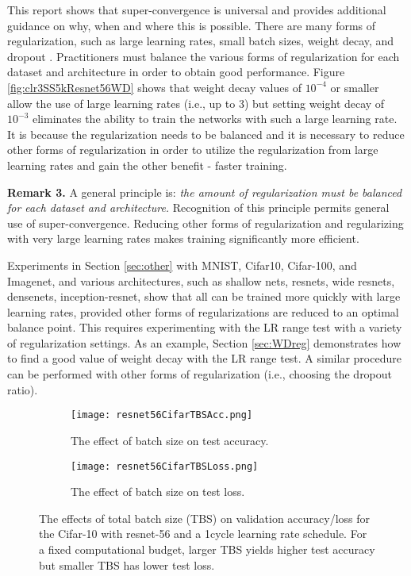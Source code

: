\documentclass{article} %
\begin{document}
This report shows that super-convergence is universal and provides additional guidance on why, when and where this is possible. There are many forms of regularization, such as large learning rates, small batch sizes, weight decay, and dropout \citep{srivastava2014dropout}.  Practitioners must balance the various forms of regularization for each dataset and architecture in order to obtain good performance.  Figure \ref{fig:clr3SS5kResnet56WD}  shows that weight decay values of $10^{-4}$ or smaller allow the use of large learning rates (i.e., up to 3) but setting weight decay of $10^{-3}$ eliminates the ability to train the networks with such a large learning rate.  It is because the regularization needs to be balanced and it is necessary to reduce other forms of regularization in order to utilize the regularization from large learning rates and gain the other benefit - faster training.

\textbf{Remark 3.}
A general principle is: \emph{the amount of regularization must be balanced for each dataset and architecture.}  Recognition of this principle permits general use of super-convergence.  Reducing other forms of regularization and regularizing with very large learning rates makes training significantly more efficient.  

Experiments in Section \ref*{sec:other} with MNIST, Cifar10, Cifar-100, and Imagenet, and various architectures, such as shallow nets,  resnets, wide resnets, densenets, inception-resnet, show that all can be trained more quickly with large learning rates, provided other forms of regularizations are reduced to an optimal balance point.  This requires experimenting with the LR range test with a variety of regularization settings.  As an example, Section \ref*{sec:WDreg} demonstrates how to find a good value of weight decay with the LR range test.  A similar procedure can be performed with other forms of regularization (i.e., choosing the dropout ratio).

\begin{figure}[tbh]
	\centering
	\begin{subfigure}[b]{0.42\textwidth}
		\texttt{[image: resnet56CifarTBSAcc.png]}
		\caption{The effect of batch size on test accuracy.}
		\label{fig:resnet56CifarTBSAcc}       %
	\end{subfigure}
	\centering
	\begin{subfigure}[b]{0.5\textwidth}
		\texttt{[image: resnet56CifarTBSLoss.png]}
		\caption{The effect of batch size on test loss.}
		\label{fig:resnet56CifarTBSLoss}       %
	\end{subfigure}
	\caption{The effects of total batch size (TBS) on validation accuracy/loss for the Cifar-10  with resnet-56 and a 1cycle learning rate schedule.  For a fixed computational budget, larger TBS yields higher test accuracy but smaller TBS has lower test loss.}
	\label{fig:batchsize}
	\vspace{-15pt}	
\end{figure}
\end{document}
